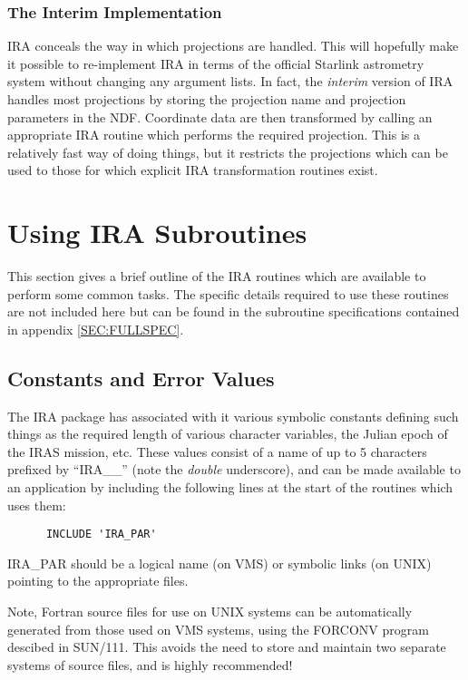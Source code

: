 \subsubsection {The Interim Implementation}
IRA conceals the way in which projections are handled. This will hopefully make
it possible to re-implement IRA in terms of the official Starlink astrometry
system without changing any argument lists. In fact, the {\em interim} version
of IRA handles most projections by storing the projection name and projection
parameters in the NDF. Coordinate data are then transformed by calling an
appropriate IRA routine which performs the required projection. This is a
relatively fast way of doing things, but it restricts the projections which can
be used to those for which explicit IRA transformation routines exist. 

\section {Using IRA Subroutines}
This section gives a brief outline of the IRA routines which are available to 
perform some common tasks. The specific details required to use these routines 
are not included here but can be found in the subroutine specifications 
contained in appendix \ref {SEC:FULLSPEC}.

\subsection {Constants and Error Values}
\label {SEC:CON}
The IRA package has associated with it various symbolic constants defining such 
things as the required length of various character variables, the Julian epoch 
of the IRAS mission, etc. These values consist of a name of up to 5 characters 
prefixed by ``IRA\_\_''  (note the {\em double} underscore), and can be made 
available to an application by including the following lines at the start of the
routines which uses them:

\begin{verbatim}
      INCLUDE 'IRA_PAR'
\end{verbatim}


IRA\_PAR should be a logical name (on VMS) or symbolic links (on UNIX) pointing
to the appropriate files. 

Note, Fortran source files for use on UNIX systems can be automatically 
generated from those used on VMS systems, using the FORCONV program descibed
in SUN/111. This avoids the need to store and maintain two separate systems of
source files, and is highly recommended!

